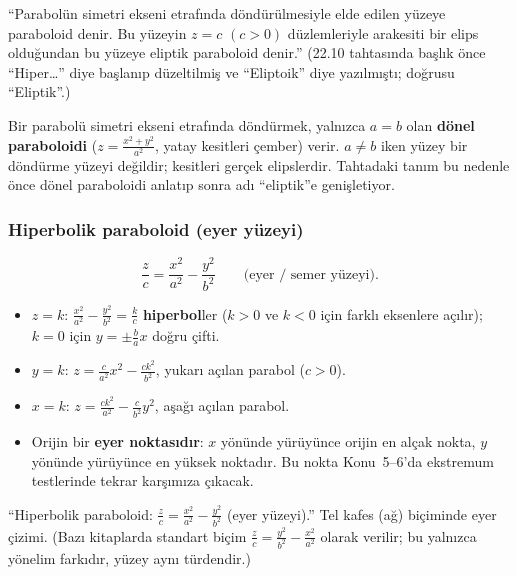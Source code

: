 \begin{tahta}
``Parabolün simetri ekseni etrafında döndürülmesiyle elde edilen yüzeye paraboloid denir. Bu yüzeyin $z=c$ $(c>0)$ düzlemleriyle arakesiti bir elips olduğundan bu yüzeye eliptik paraboloid denir.'' (22.10 tahtasında başlık önce ``Hiper\ldots'' diye başlanıp düzeltilmiş ve ``Eliptoik'' diye yazılmıştı; doğrusu ``Eliptik''.)
\end{tahta}
\begin{bilgi}
Bir parabolü simetri ekseni etrafında döndürmek, yalnızca $a=b$ olan \textbf{dönel paraboloidi} ($z=\frac{x^2+y^2}{a^2}$, yatay kesitleri çember) verir. $a\neq b$ iken yüzey bir döndürme yüzeyi değildir; kesitleri gerçek elipslerdir. Tahtadaki tanım bu nedenle önce dönel paraboloidi anlatıp sonra adı ``eliptik''e genişletiyor.
\end{bilgi}

\subsubsection{Hiperbolik paraboloid (eyer yüzeyi)}

\begin{tanim}
\[ \frac{z}{c}=\frac{x^2}{a^2}-\frac{y^2}{b^2}\qquad\text{(eyer / semer yüzeyi)}. \]
\end{tanim}
\begin{itemize}
  \item $z=k$: $\frac{x^2}{a^2}-\frac{y^2}{b^2}=\frac kc$ \textbf{hiperbol}ler ($k>0$ ve $k<0$ için farklı eksenlere açılır); $k=0$ için $y=\pm\frac ba x$ doğru çifti.
  \item $y=k$: $z=\frac{c}{a^2}x^2-\frac{ck^2}{b^2}$, yukarı açılan parabol ($c>0$).
  \item $x=k$: $z=\frac{ck^2}{a^2}-\frac{c}{b^2}y^2$, aşağı açılan parabol.
  \item Orijin bir \textbf{eyer noktasıdır}: $x$ yönünde yürüyünce orijin en alçak nokta, $y$ yönünde yürüyünce en yüksek noktadır. Bu nokta Konu~5--6'da ekstremum testlerinde tekrar karşımıza çıkacak.
\end{itemize}

\begin{tahta}
``Hiperbolik paraboloid: $\frac zc=\frac{x^2}{a^2}-\frac{y^2}{b^2}$ (eyer yüzeyi).'' Tel kafes (ağ) biçiminde eyer çizimi.
(Bazı kitaplarda standart biçim $\frac zc=\frac{y^2}{b^2}-\frac{x^2}{a^2}$ olarak verilir; bu yalnızca yönelim farkıdır, yüzey aynı türdendir.)
\end{tahta}

